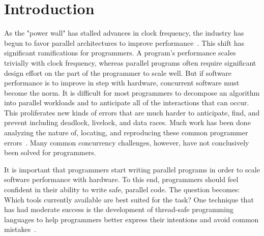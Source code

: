 \section{Introduction}\label{sec::introduction}

As the "power wall" has stalled advances in clock frequency, the industry has begun to favor parallel architectures to improve performance~\cite{sutter2005free}. This shift has significant ramifications for
programmers. A program’s performance scales trivially with clock frequency, whereas parallel programs
often require significant design effort on the part of the programmer to scale well. But if software performance is to improve in step with hardware, concurrent software must become the norm. It is difficult for most programmers to decompose an algorithm into parallel workloads and to anticipate all of the interactions that
can occur. This proliferates new kinds of errors that are much harder to anticipate, find, and prevent including deadlock, livelock, and data races. Much work has been done analyzing the nature of, locating, and reproducing these common programmer errors~\cite{kendo,grace,ctrigger,heisenbug,learning}. Many common concurrency challenges, however, have not conclusively been solved for programmers.

It is important that programmers start writing parallel programs in order to scale software performance with hardware. To this end, programmers should feel confident in their ability to write safe, parallel code. The question becomes: Which tools currently available are best suited for the task? One technique that has had moderate success is the development of thread-safe programming languages to help programmers better express their intentions and avoid common mistakes~\cite{learning}.


